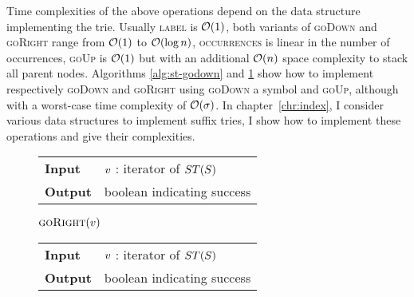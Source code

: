 Time complexities of the above operations depend on the data structure implementing the trie.
Usually \textsc{label} is $\mathcal{O}(1)$, both variants of \textsc{goDown} and \textsc{goRight} range from $\mathcal{O}(1)$ to $\mathcal{O}(\log{n})$, \textsc{occurrences} is linear in the number of occurrences, \textsc{goUp} is $\mathcal{O}(1)$ but with an additional $\mathcal{O}(n)$ space complexity to stack all parent nodes.
Algorithms \ref{alg:st-godown} and \ref{alg:st-goright} show how to implement respectively \textsc{goDown} and \textsc{goRight} using \textsc{goDown} a symbol and \textsc{goUp}, although with a worst-case time complexity of $\mathcal{O}(\sigma)$.
In chapter~\ref{chr:index}, I consider various data structures to implement suffix tries, I show how to implement these operations and give their complexities.

\begin{figure*}[t]
\begin{minipage}[t]{.5\textwidth}
\begin{algorithm}[H]
\begin{tabular}{ll}
\textbf{Input}  & $v$ : iterator of $ST(S)$\\
\textbf{Output} & boolean indicating success\\
\end{tabular}
\begin{algorithmic}[1]
	\State \Return \False
\EndIf
{}
	\State \Return \True
\Else
	\State \Return $\Call{goRight}{\StrieNode}$		
\EndIf
\end{algorithmic}
\label{alg:st-godown}
\end{algorithm}
\end{minipage}
\hfill
\begin{minipage}[t]{.5\textwidth}
\begin{algorithm}[H]
\begin{tabular}{ll}
\textbf{Input}  & $v$ : iterator of $ST(S)$\\
\textbf{Output} & boolean indicating success\\
\end{tabular}
\begin{algorithmic}[1]
			\State \Return \True
		\EndIf
	\EndWhile
\EndIf
\State \Return \False $\phantom{()}$
\end{algorithmic}
\label{alg:st-goright}
\end{algorithm}
\end{minipage}
\end{figure*}


